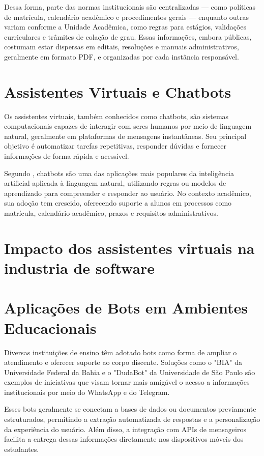 Dessa forma, parte das normas institucionais são centralizadas — como políticas de matrícula, calendário acadêmico e procedimentos gerais — enquanto outras variam conforme a Unidade Acadêmica, como regras para estágios, validações curriculares e trâmites de colação de grau. Essas informações, embora públicas, costumam estar dispersas em editais, resoluções e manuais administrativos, geralmente em formato PDF, e organizadas por cada instância responsável.


\section{Assistentes Virtuais e Chatbots}

Os assistentes virtuais, também conhecidos como chatbots, são sistemas computacionais capazes de interagir com seres humanos por meio de linguagem natural, geralmente em plataformas de mensagens instantâneas. Seu principal objetivo é automatizar tarefas repetitivas, responder dúvidas e fornecer informações de forma rápida e acessível.

Segundo \cite{russell2010artificial}, chatbots são uma das aplicações mais populares da inteligência artificial aplicada à linguagem natural, utilizando regras ou modelos de aprendizado para compreender e responder ao usuário. No contexto acadêmico, sua adoção tem crescido, oferecendo suporte a alunos em processos como matrícula, calendário acadêmico, prazos e requisitos administrativos.

\section{Impacto dos assistentes virtuais na industria de software}



\section{Aplicações de Bots em Ambientes Educacionais}

Diversas instituições de ensino têm adotado bots como forma de ampliar o atendimento e oferecer suporte ao corpo discente. Soluções como o "BIA" da Universidade Federal da Bahia e o "DudaBot" da Universidade de São Paulo são exemplos de iniciativas que visam tornar mais amigável o acesso a informações institucionais por meio do WhatsApp e do Telegram.

Esses bots geralmente se conectam a bases de dados ou documentos previamente estruturados, permitindo a extração automatizada de respostas e a personalização da experiência do usuário. Além disso, a integração com APIs de mensageiros facilita a entrega dessas informações diretamente nos dispositivos móveis dos estudantes.

